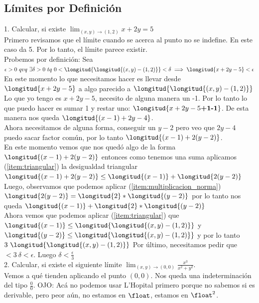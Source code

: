 \documentclass[10pt,a4paper]{article}
\begin{document}
\subsection*{Límites por Definición}
\label{subsec:limites_definicion} 
1. Calcular, si existe $\lim_{(x,y) \rightarrow (1, 2)} x+2y = 5$ \\
Primero revisamos que el límite cuando se acerca al punto no se indefine. En este caso da 5. Por lo tanto, el límite parece existir. \\
Probemos por definición: Sea $\epsilon > 0 \ qvq \ \exists \delta > 0 \ tq \ 0 < \longitud{\longitud{(x,y) - (1, 2)}} < \delta \implies \longitud{x+2y-5} < \epsilon$ \\
En este momento lo que necesitamos hacer es llevar desde $\longitud{x+2y-5}$ a algo parecido a $\longitud{\longitud{(x,y) - (1, 2)}}$ \\
Lo que yo tengo es $x+2y-5$, necesito de alguna manera un -1. Por lo tanto lo que puedo hacer es sumar 1 y restar uno: $\longitud{x+2y-5\textbf{+1}\textbf{-1}}$. De esta manera nos queda $\longitud{(x-1)+2y-4}$. \\
Ahora necesitamos de alguna forma, conseguir un $y-2$ pero veo que $2y-4$ puedo sacar factor común, por lo tanto $\longitud{(x-1)+2(y-2)}$. \\
En este momento vemos que nos quedó algo de la forma $\longitud{(x-1) + 2(y-2)}$ entonces como tenemos una suma aplicamos (\ref{item:triangular}) la desigualdad triangular $\longitud{(x-1) + 2(y-2)} \le \longitud{(x-1)} + \longitud{2 (y-2)}$ \\
Luego, observamos que podemos aplicar (\ref{item:multiplicacion_norma})$ \longitud{2 (y-2)} =  \longitud{2} * \longitud{(y-2)}$ por lo tanto nos queda $\longitud{(x-1)} + \longitud{2} * \longitud{(y-2)} $ \\
Ahora vemos que podemos aplicar (\ref{item:triangular}) que $\longitud{(x-1)} \le \longitud{\longitud{(x, y) - (1, 2)}}$ y $\longitud{(y-2)} \le \longitud{\longitud{(x, y) - (1, 2)}}$ y por lo tanto $3 \ \longitud{\longitud{(x, y) - (1, 2)}}$
Por último, necesitamos pedir que $< 3 \ \delta < \epsilon$. Luego $\delta < \frac{\epsilon}{3}$ \\
2. Calcular, si existe el siguiente límite $\lim_{(x,y) \rightarrow (0, 0)} \frac{x^{3}}{x^{2} + y^{2}}$. \\
Vemos a qué tienden aplicando el punto $(0,0)$. Nos queda una indeterminación del tipo $\frac{0}{0}$. OJO: Acá no podemos usar L'Hopital primero porque no sabemos si es derivable, pero peor aún, no estamos en $\float$, estamos en $\float^{2}$. \\
\end{document}
